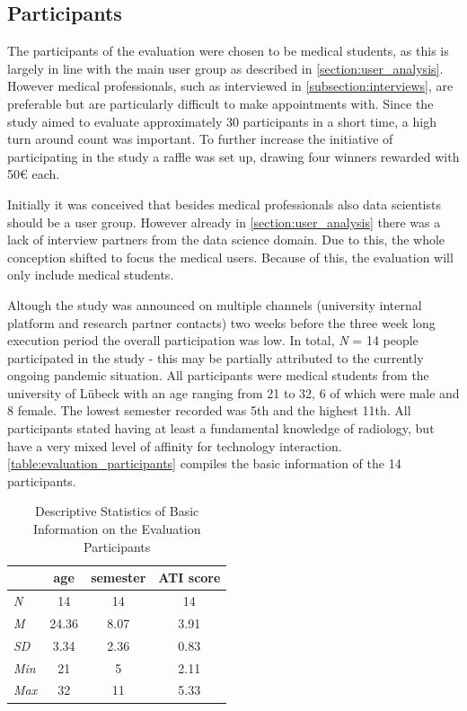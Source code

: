 \documentclass[11pt,a4paper,english]{scrreprt}
\begin{document}
\subsection{Participants}
The participants of the evaluation were chosen to be medical students, as this is largely in line with the main user group as described in \autoref{section:user_analysis}. However medical professionals, such as interviewed in \autoref{subsection:interviews}, are preferable but are particularly difficult to make appointments with. Since the study aimed to evaluate approximately 30 participants in a short time, a high turn around count was important. To further increase the initiative of participating in the study a raffle was set up, drawing four winners rewarded with 50€ each.

Initially it was conceived that besides medical professionals also data scientists should be a user group. However already in \autoref{section:user_analysis} there was a lack of interview partners from the data science domain. Due to this, the whole conception shifted to focus the medical users. Because of this, the evaluation will only include medical students.

Altough the study was announced on multiple channels (university internal platform and research partner contacts) two weeks before the three week long execution period the overall participation was low. In total, \textit{N} = 14 people participated in the study - this may be partially attributed to the currently ongoing pandemic situation. All participants were medical students from the university of Lübeck with an age ranging from 21 to 32, 6 of which were male and 8 female. The lowest semester recorded was 5th and the highest 11th. All participants stated having at least a fundamental knowledge of radiology, but have a very mixed level of affinity for technology interaction. \autoref{table:evaluation_participants} compiles the basic information of the 14 participants.

\begin{table}[htbp]
    \centering
    \begin{tabularx}{0.45\textwidth}{ l c c c }
        \toprule
        & age & semester & ATI score \\
        \midrule
        \textit{N} & 14 & 14 & 14 \\
        \textit{M} & 24.36 & 8.07 & 3.91 \\
        \textit{SD} & 3.34 & 2.36 & 0.83 \\
        \textit{Min} & 21 & 5 & 2.11 \\
        \textit{Max} & 32 & 11 & 5.33 \\
        \bottomrule
    \end{tabularx}
    \caption{Descriptive Statistics of Basic Information on the Evaluation Participants}
    \label{table:evaluation_participants}
\end{table}
\end{document}
